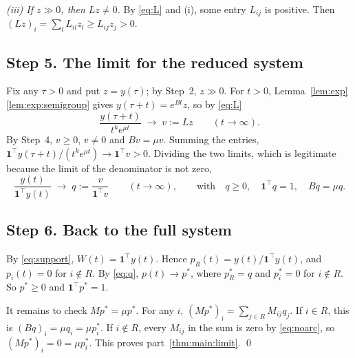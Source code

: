 \documentclass[11pt]{article}
\theoremstyle{definition}
\theoremstyle{remark}
\newcommand{\one}{\mathbf{1}}
\newcommand{\T}{\top}
\begin{document}
\emph{\textup{(iii)} If $z \gg 0$, then $Lz \ne 0$.} By \eqref{eq:L} and (i), some entry $L_{ij}$
is positive. Then $(Lz)_i = \sum_{l} L_{il} z_l \ge L_{ij} z_j > 0$.

\subsection*{Step 5. The limit for the reduced system}

Fix any $\tau > 0$ and put $z = y(\tau)$; by Step~2, $z \gg 0$. For $t > 0$,
Lemma~\ref{lem:exp}\ref{lem:exp:semigroup} gives $y(\tau + t) = e^{Bt} z$, so by \eqref{eq:L}
\[
  \frac{y(\tau + t)}{t^{k} e^{\mu t}} \;\longrightarrow\; v := Lz
  \qquad (t \to \infty).
\]
By Step~4, $v \ge 0$, $v \ne 0$ and $Bv = \mu v$. Summing the entries,
$\one^\T y(\tau + t) / (t^{k} e^{\mu t}) \to \one^\T v > 0$. Dividing the two limits, which is
legitimate because the limit of the denominator is not zero,
\begin{equation}\label{eq:q}
  \frac{y(t)}{\one^\T y(t)} \;\longrightarrow\; q := \frac{v}{\one^\T v}
  \qquad (t \to \infty),
  \qquad\text{with}\quad q \ge 0, \quad \one^\T q = 1, \quad Bq = \mu q .
\end{equation}

\subsection*{Step 6. Back to the full system}

By \eqref{eq:support}, $W(t) = \one^\T y(t)$. Hence $p_R(t) = y(t)/\one^\T y(t)$, and $p_i(t) = 0$
for $i \notin R$. By \eqref{eq:q}, $p(t) \to p^*$, where $p^*_R = q$ and $p^*_i = 0$ for
$i \notin R$. So $p^* \ge 0$ and $\one^\T p^* = 1$.

It remains to check $M p^* = \mu p^*$. For any $i$, $(M p^*)_i = \sum_{j \in R} M_{ij} q_j$.
If $i \in R$, this is $(Bq)_i = \mu q_i = \mu p^*_i$. If $i \notin R$, every $M_{ij}$ in the sum is
zero by \eqref{eq:noarc}, so $(M p^*)_i = 0 = \mu p^*_i$. This proves
part~\ref{thm:main:limit}. \qed
\end{document}
